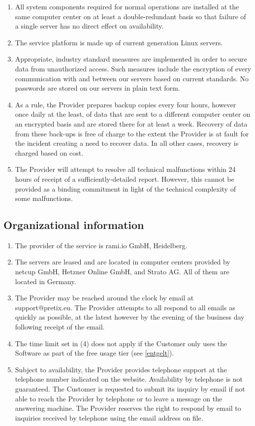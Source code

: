 \documentclass{terms}
\begin{document}
\begin{enumerate}
\item All system components required for normal operations are installed at the same computer center on at least a double-redundant basis so that failure of a single server has no direct effect on availability.
\item The service platform is made up of current generation Linux servers.
\item Appropriate, industry standard measures are implemented in order to secure data from unauthorized access. Such measures include the encryption of every communication with and between our servers based on current standards. No passwords are stored on our servers in plain text form.
\item As a rule, the Provider prepares backup copies every four hours, however once daily at the least, of data that are sent to a different computer center on an encrypted basis and are stored there for at least a week. Recovery of data from these back-ups is free of charge to the extent the Provider is at fault for the incident creating a need to recover data. In all other cases, recovery is charged based on cost.
\item The Provider will attempt to resolve all technical malfunctions within 24 hours of receipt of a sufficiently-detailed report. However, this cannot be provided as a binding commitment in light of the technical complexity of some malfunctions.
\end{enumerate}
\subsection{Organizational information}
\begin{enumerate}
\item The provider of the service is rami.io GmbH, Heidelberg.
\item The servers are leased and are located in computer centers provided by netcup GmbH, Hetzner Online GmbH, and Strato AG. All of them are located in Germany.
\item The Provider may be reached around the clock by email at support@pretix.eu. The Provider attempts to all respond to all emails as quickly as possible, at the latest however by the evening of the business day following receipt of the email.
\item The time limit set in (4) does not apply if the Customer only uses the Software as part of the free usage tier (see \ref{entgelt}).
\item Subject to availability, the Provider provides telephone support at the telephone number indicated on the website. Availability by telephone is not guaranteed. The Customer is requested to submit its inquiry by email if not able to reach the Provider by telephone or to leave a message on the answering machine. The Provider reserves the right to respond by email to inquiries received by telephone using the email address on file.
\end{enumerate}
\end{document}
